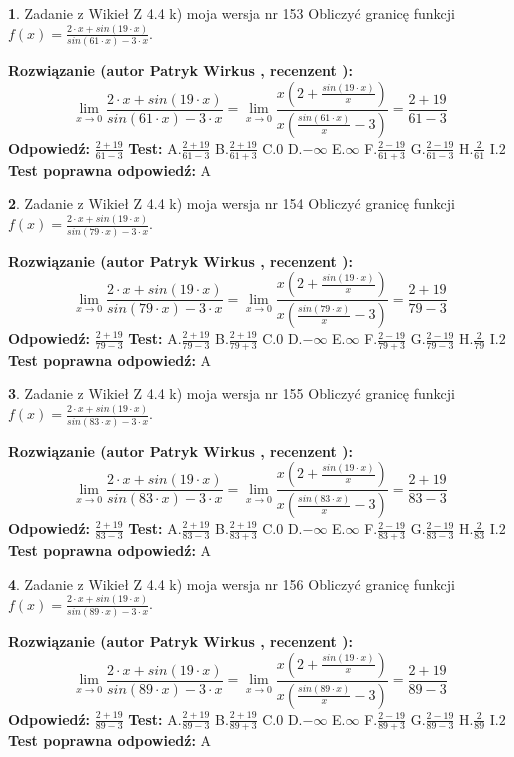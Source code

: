 \documentclass[12pt, a4paper]{article}
\theoremstyle{definition} %
\newtheorem{zad}{}
\newcommand{\zadStart}[1]{\begin{zad}#1\newline}
\newcommand{\zadStop}{\end{zad}}
\newcommand{\rozwStart}[2]{\noindent \textbf{Rozwiązanie (autor #1 , recenzent #2): }\newline}
\newcommand{\rozwStop}{\newline}
\newcommand{\odpStart}{\noindent \textbf{Odpowiedź:}\newline}
\newcommand{\odpStop}{\newline}
\newcommand{\testStart}{\noindent \textbf{Test:}\newline}
\newcommand{\testStop}{\newline}
\newcommand{\kluczStart}{\noindent \textbf{Test poprawna odpowiedź:}\newline}
\newcommand{\kluczStop}{\newline}
\begin{document}
\zadStart{Zadanie z Wikieł Z 4.4 k) moja wersja nr 153}
Obliczyć granicę funkcji $f(x)=\frac{2\cdot x +sin(19\cdot x)}{sin(61\cdot x) -3\cdot x}$.
\zadStop
\rozwStart{Patryk Wirkus}{}
$$\lim\limits_{x\to 0}\frac{2\cdot x +sin(19\cdot x)}{sin(61\cdot x) -3\cdot x}
=\lim\limits_{x\to 0}\frac{x(2+\frac{sin(19\cdot x)}{x})}{x(\frac{sin(61\cdot x)}{x}-3)}
=\frac{2+19}{61-3}$$
\rozwStop
\odpStart
$\frac{2+19}{61-3}$
\odpStop
\testStart
A.$\frac{2+19}{61-3}$
B.$\frac{2+19}{61+3}$
C.$0$
D.$-\infty$
E.$\infty$
F.$\frac{2-19}{61+3}$
G.$\frac{2-19}{61-3}$
H.$\frac{2}{61}$
I.$2$
\testStop
\kluczStart
A
\kluczStop



\zadStart{Zadanie z Wikieł Z 4.4 k) moja wersja nr 154}
Obliczyć granicę funkcji $f(x)=\frac{2\cdot x +sin(19\cdot x)}{sin(79\cdot x) -3\cdot x}$.
\zadStop
\rozwStart{Patryk Wirkus}{}
$$\lim\limits_{x\to 0}\frac{2\cdot x +sin(19\cdot x)}{sin(79\cdot x) -3\cdot x}
=\lim\limits_{x\to 0}\frac{x(2+\frac{sin(19\cdot x)}{x})}{x(\frac{sin(79\cdot x)}{x}-3)}
=\frac{2+19}{79-3}$$
\rozwStop
\odpStart
$\frac{2+19}{79-3}$
\odpStop
\testStart
A.$\frac{2+19}{79-3}$
B.$\frac{2+19}{79+3}$
C.$0$
D.$-\infty$
E.$\infty$
F.$\frac{2-19}{79+3}$
G.$\frac{2-19}{79-3}$
H.$\frac{2}{79}$
I.$2$
\testStop
\kluczStart
A
\kluczStop



\zadStart{Zadanie z Wikieł Z 4.4 k) moja wersja nr 155}
Obliczyć granicę funkcji $f(x)=\frac{2\cdot x +sin(19\cdot x)}{sin(83\cdot x) -3\cdot x}$.
\zadStop
\rozwStart{Patryk Wirkus}{}
$$\lim\limits_{x\to 0}\frac{2\cdot x +sin(19\cdot x)}{sin(83\cdot x) -3\cdot x}
=\lim\limits_{x\to 0}\frac{x(2+\frac{sin(19\cdot x)}{x})}{x(\frac{sin(83\cdot x)}{x}-3)}
=\frac{2+19}{83-3}$$
\rozwStop
\odpStart
$\frac{2+19}{83-3}$
\odpStop
\testStart
A.$\frac{2+19}{83-3}$
B.$\frac{2+19}{83+3}$
C.$0$
D.$-\infty$
E.$\infty$
F.$\frac{2-19}{83+3}$
G.$\frac{2-19}{83-3}$
H.$\frac{2}{83}$
I.$2$
\testStop
\kluczStart
A
\kluczStop



\zadStart{Zadanie z Wikieł Z 4.4 k) moja wersja nr 156}
Obliczyć granicę funkcji $f(x)=\frac{2\cdot x +sin(19\cdot x)}{sin(89\cdot x) -3\cdot x}$.
\zadStop
\rozwStart{Patryk Wirkus}{}
$$\lim\limits_{x\to 0}\frac{2\cdot x +sin(19\cdot x)}{sin(89\cdot x) -3\cdot x}
=\lim\limits_{x\to 0}\frac{x(2+\frac{sin(19\cdot x)}{x})}{x(\frac{sin(89\cdot x)}{x}-3)}
=\frac{2+19}{89-3}$$
\rozwStop
\odpStart
$\frac{2+19}{89-3}$
\odpStop
\testStart
A.$\frac{2+19}{89-3}$
B.$\frac{2+19}{89+3}$
C.$0$
D.$-\infty$
E.$\infty$
F.$\frac{2-19}{89+3}$
G.$\frac{2-19}{89-3}$
H.$\frac{2}{89}$
I.$2$
\testStop
\kluczStart
A
\kluczStop
\end{document}
